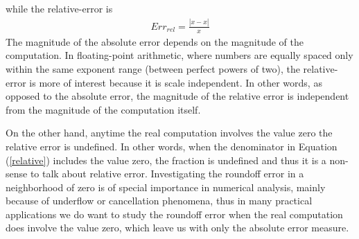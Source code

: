 while the relative-error is 
%
\begin{align}
Err_{rel}=\frac{|x-\widehat{x}|}{x}\label{relative}
\end{align}
%
The magnitude of the absolute error depends on the magnitude of the computation.
%
In floating-point arithmetic, where numbers are equally spaced only within the same exponent range (between perfect powers of two), the relative-error is more of interest because it is scale independent.
%
In other words, as opposed to the absolute error, the magnitude of the relative error is independent from the magnitude of the computation itself.
%

On the other hand, anytime the real computation involves the value zero the relative error is undefined.
%
In other words, when the denominator in Equation (\ref{relative}) includes the value zero, the fraction is undefined and thus it is a non-sense to talk about relative error.
%
Investigating the roundoff error in a neighborhood of zero is of special importance in numerical analysis, mainly because of underflow or cancellation phenomena, thus in many practical applications we do want to study the roundoff error when the real computation does involve the value zero, which leave us with only the absolute error measure.
%
